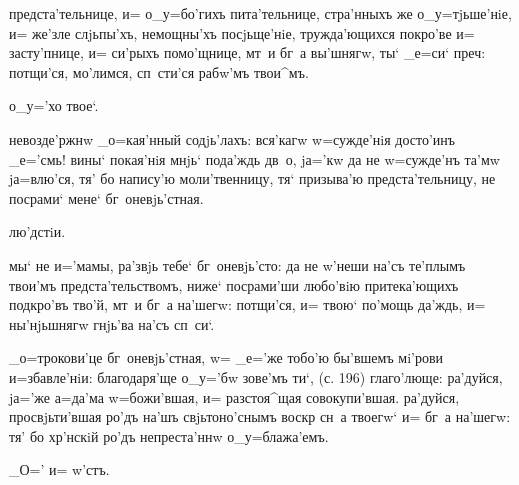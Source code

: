 предста'тельнице, и= о_у=бо'гихъ пита'тельнице, 
стра'нныхъ же о_у=тjьше'нiе, и= же'зле слjьпы'хъ, 
немощны'хъ посjьще'нiе, тружда'ющихся покро'ве и= 
засту'пнице, и= си'рыхъ помо'щнице, мт~и бг~а вы'шнягw, 
ты` _е=си` преч: потщи'ся, мо'лимся, сп~сти'ся 
рабw'мъ твои^мъ.

о_у='хо твое`.

невозде'ржнw _о=кая'нный содjь'лахъ: вся'кагw w=сужде'нiя 
досто'инъ _е='смь! вины` покая'нiя мнjь` пода'ждь дв~о, 
jа='кw да не w=сужде'нъ та'мw jа=влю'ся, тя' бо напису'ю 
моли'твенницу, тя` призыва'ю предста'тельницу, не 
посрами` мене` бг~оневjь'стная.

лю'дстiи.

мы` не и='мамы, ра'звjь тебе` бг~оневjь'сто: да не 
w'неши на'съ те'плымъ твои'мъ предста'тельствомъ, 
ниже` посрами'ши любо'вiю притека'ющихъ под\ъ кро'въ 
тво'й, мт~и бг~а на'шегw: потщи'ся, и= твою` по'мощь 
да'ждь, и= ны'нjьшнягw гнjь'ва на'съ сп~си`.


_о=трокови'це бг~оневjь'стная, w= _е='же тобо'ю бы'вшемъ 
мi'рови и=збавле'нiи: благодаря'ще о_у='бw зове'мъ ти`, 
(с. 196) глаго'люще: ра'дуйся, jа='же а=да'ма 
w=божи'вшая, и= разстоя^щая совокупи'вшая. ра'дуйся, 
просвjьти'вшая ро'дъ на'шъ свjьтоно'снымъ воскр 
сн~а твоегw` и= бг~а на'шегw: тя' бо хр'нскiй ро'дъ 
непреста'ннw о_у=блажа'емъ.

_О='%
и= w'стъ.%
